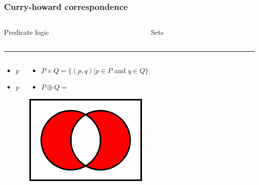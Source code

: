 \documentclass{beamer}
\begin{document}
\begin{frame}
    \frametitle{Curry-howard correspondence}
    \begin{columns}[T]
        \begin{column}{.2\textwidth}
        Predicate logic
        \end{column}
        \hfill
        \begin{column}{.48\textwidth}
        Sets
        \end{column}
    \end{columns}
    \color{black}\rule{\linewidth}{1pt}
    \begin{columns}[T]
        \begin{column}{.2\textwidth}
            \begin{itemize}
                \item $ p \wedge q $ \\
                \item $ p \vee q $
            \end{itemize}
        \end{column}
        \hfill
        \begin{column}{.6\textwidth}
            \begin{itemize}
                \item $ P \times Q = \{ (p, q) | p \in P$ and $q \in Q \} $ \\
                \item $ P \oplus Q = $ \\
            \end{itemize}
            \includegraphics[width=0.5\textwidth]{exclusiveOr.png}
        \end{column}
    \end{columns}
\end{frame}
\end{document}
